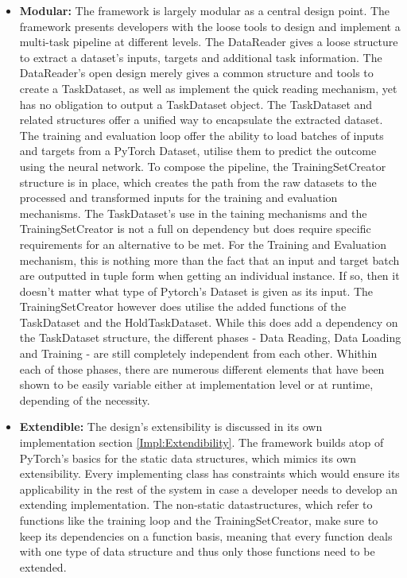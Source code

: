 \begin{itemize}
	\item \textbf{Modular:} 
	The framework is largely modular as a central design point. The framework presents developers with the loose tools to design and implement a multi-task pipeline at different levels. The DataReader gives a loose structure to extract a dataset's inputs, targets and additional task information. The DataReader's open design merely gives a common structure and tools to create a TaskDataset, as well as implement the quick reading mechanism, yet has no obligation to output a TaskDataset object. The TaskDataset and related structures offer a unified way to encapsulate the extracted dataset. The training and evaluation loop offer the ability to load batches of inputs and targets from a PyTorch Dataset, utilise them to predict the outcome using the neural network. To compose the pipeline, the TrainingSetCreator structure is in place, which creates the path from the raw datasets to the processed and transformed inputs for the training and evaluation mechanisms. The TaskDataset's use in the taining mechanisms and the TrainingSetCreator is not a full on dependency but does require specific requirements for an alternative to be met. For the Training and Evaluation mechanism, this is nothing more than the fact that an input and target batch are outputted in tuple form when getting an individual instance. If so, then it doesn't matter what type of Pytorch's Dataset is given as its input. The TrainingSetCreator however does utilise the added functions of the TaskDataset and the HoldTaskDataset. While this does add a dependency on the TaskDataset structure, the different phases - Data Reading, Data Loading and Training - are still completely independent from each other. Whithin each of those phases, there are numerous different elements that have been shown to be easily variable either at implementation level or at runtime, depending of the necessity. \\
	\item \textbf{Extendible:} 
	The design's extensibility is discussed in its own implementation section \ref{Impl:Extendibility}. The framework builds atop of PyTorch's basics for the static data structures, which mimics its own extensibility. Every implementing class has constraints which would ensure its applicability in the rest of the system in case a developer needs to develop an extending implementation. The non-static datastructures, which refer to functions like the training loop and the TrainingSetCreator, make sure to keep its dependencies on a function basis, meaning that every function deals with one type of data structure and thus only those functions need to be extended. 
	

\end{itemize}
